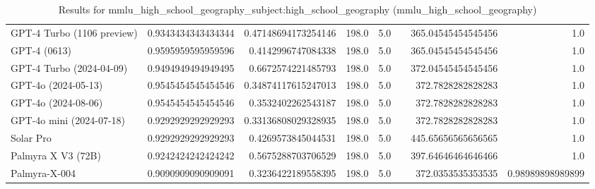 \begin{table}[htp]
{\begin{tabular}{lrrrrrrr}
GPT-4 Turbo (1106 preview) & 0.9343434343434344 & 0.47148694173254146 & 198.0 & 5.0 &  & 365.04545454545456 & 1.0 \\
GPT-4 (0613) & 0.9595959595959596 & 0.4142996747084338 & 198.0 & 5.0 &  & 365.04545454545456 & 1.0 \\
GPT-4 Turbo (2024-04-09) & 0.9494949494949495 & 0.6672574221485793 & 198.0 & 5.0 &  & 372.04545454545456 & 1.0 \\
GPT-4o (2024-05-13) & 0.9545454545454546 & 0.34874117615247013 & 198.0 & 5.0 &  & 372.7828282828283 & 1.0 \\
GPT-4o (2024-08-06) & 0.9545454545454546 & 0.3532402262543187 & 198.0 & 5.0 &  & 372.7828282828283 & 1.0 \\
GPT-4o mini (2024-07-18) & 0.9292929292929293 & 0.33136808029328935 & 198.0 & 5.0 &  & 372.7828282828283 & 1.0 \\
Solar Pro & 0.9292929292929293 & 0.4269573845044531 & 198.0 & 5.0 &  & 445.65656565656565 & 1.0 \\
Palmyra X V3 (72B) & 0.9242424242424242 & 0.5675288703706529 & 198.0 & 5.0 &  & 397.64646464646466 & 1.0 \\
Palmyra-X-004 & 0.9090909090909091 & 0.3236422189558395 & 198.0 & 5.0 &  & 372.0353535353535 & 0.98989898989899 \\
\bottomrule
\end{tabular}}
\caption{Results for mmlu_high_school_geography_subject:high_school_geography (mmlu_high_school_geography)}
\label{fig:mmlu_high_school_geography_subject:high_school_geography (mmlu_high_school_geography)}
\end{table}